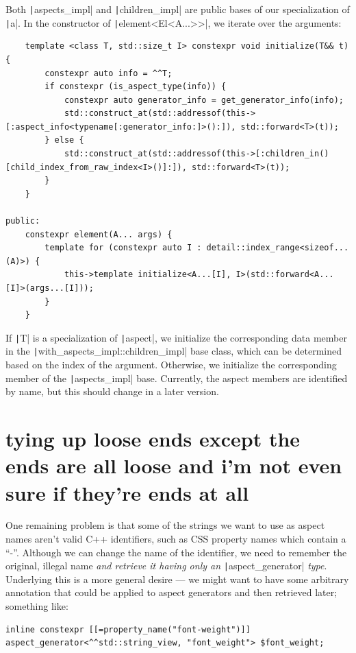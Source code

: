 \documentclass[10pt]{article}
\begin{document}
Both \texttt|aspects_impl| and \texttt|children_impl| are public bases of our specialization of \texttt|a|. In the constructor of \texttt|element<El<A...>>|, we iterate over the arguments:
\begin{verbatim}
    template <class T, std::size_t I> constexpr void initialize(T&& t) {
        constexpr auto info = ^^T;
        if constexpr (is_aspect_type(info)) {
            constexpr auto generator_info = get_generator_info(info);
            std::construct_at(std::addressof(this->[:aspect_info<typename[:generator_info:]>():]), std::forward<T>(t));
        } else {
            std::construct_at(std::addressof(this->[:children_in()[child_index_from_raw_index<I>()]:]), std::forward<T>(t));
        }
    }

public:
    constexpr element(A... args) {
        template for (constexpr auto I : detail::index_range<sizeof...(A)>) {
            this->template initialize<A...[I], I>(std::forward<A...[I]>(args...[I]));
        }
    }
\end{verbatim}

If \texttt|T| is a specialization of \texttt|aspect|, we initialize the corresponding data member in the \texttt|with_aspects_impl::children_impl| base class, which can be determined based on the index of the argument. Otherwise, we initialize the corresponding member of the \texttt|aspects_impl| base. Currently, the aspect members are identified by name, but this should change in a later version. 

\section*{tying up loose ends except the ends are all loose and i'm not even sure if they're ends at all}

One remaining problem is that some of the strings we want to use as aspect names aren't valid C++ identifiers, such as CSS property names which contain a ``-''. Although we can change the name of the identifier, we need to remember the original, illegal name \textit{and retrieve it having only an} \texttt|aspect_generator| \textit{type}. Underlying this is a more general desire --- we might want to have some arbitrary annotation that could be applied to aspect generators and then retrieved later; something like:
\begin{verbatim}
inline constexpr [[=property_name("font-weight")]] aspect_generator<^^std::string_view, "font_weight"> $font_weight;
\end{verbatim}
\end{document}
